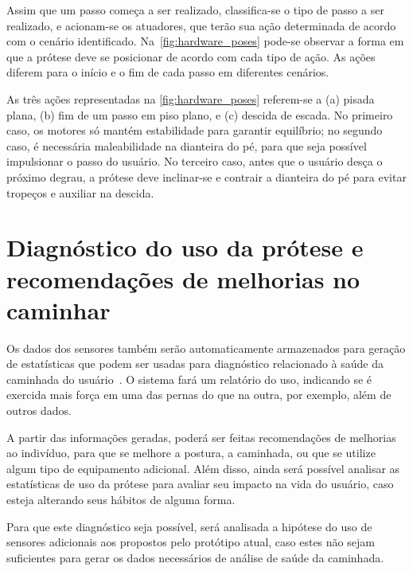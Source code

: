 Assim que um passo começa a ser realizado, classifica-se o tipo de passo a ser realizado, e acionam-se os atuadores, que terão sua ação determinada de acordo com o cenário identificado. Na~\autoref{fig:hardware_poses} pode-se observar a forma em que a prótese deve se posicionar de acordo com cada tipo de ação. As ações diferem para o início e o fim de cada passo em diferentes cenários.

As três ações representadas na \autoref{fig:hardware_poses} referem-se a (a) pisada plana, (b) fim de um passo em piso plano, e (c) descida de escada. No primeiro caso, os motores só mantém estabilidade para garantir equilíbrio; no segundo caso, é necessária maleabilidade na dianteira do pé, para que seja possível impulsionar o passo do usuário. No terceiro caso, antes que o usuário desça o próximo degrau, a prótese deve inclinar-se e contrair a dianteira do pé para evitar tropeços e auxiliar na descida.

\section{Diagnóstico do uso da prótese e recomendações de melhorias no caminhar}\label{sec:metodo_diagnostico}
Os dados dos sensores também serão automaticamente armazenados para geração de estatísticas que podem ser usadas para diagnóstico relacionado à saúde da caminhada do usuário~\cite{SabatiniMSC05}. O sistema fará um relatório do uso, indicando se é exercida mais força em uma das pernas do que na outra, por exemplo, além de outros dados.

A partir das informações geradas, poderá ser feitas recomendações de melhorias ao indivíduo, para que se melhore a postura, a caminhada, ou que se utilize algum tipo de equipamento adicional. Além disso, ainda será possível analisar as estatísticas de uso da prótese para avaliar seu impacto na vida do usuário, caso esteja alterando seus hábitos de alguma forma.

Para que este diagnóstico seja possível, será analisada a hipótese do uso de sensores adicionais aos propostos pelo protótipo atual, caso estes não sejam suficientes para gerar os dados necessários de análise de saúde da caminhada.